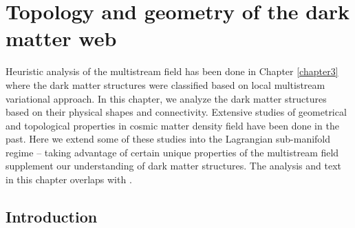 \chapter{Topology and geometry of the dark matter web}\label{chapter4}

Heuristic analysis of the multistream field has been done in Chapter \ref{chapter3} where the dark matter structures were classified based on local multistream variational approach. In this chapter, we analyze the dark matter structures based on their physical shapes and connectivity. Extensive studies of geometrical and topological properties in cosmic matter density field have been done in the past. Here we extend some of these studies into the Lagrangian sub-manifold regime -- taking advantage of certain unique properties of the multistream field supplement our understanding of dark matter structures. The analysis and text in this chapter overlaps with \cite{Ramachandra2017}.   


\section{Introduction} 
\label{sec:4intro}


